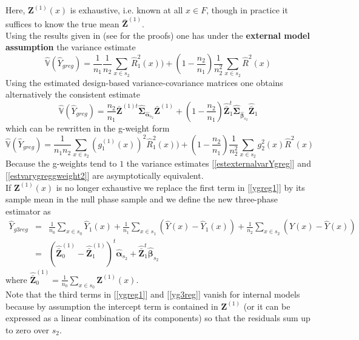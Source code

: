\documentclass[a4paper,12pt,leqno, titlepage]{article}
\newcommand{\VAR}{\mathbb{V}}
\begin{document}
Here, $\pmb{Z}^{(1)}(x)$ is exhaustive, i.e. known at all $x\in{F}$, though in practice it suffices to know the true mean $\bar{\pmb{Z}}^{(1)}$. \\
Using the results given in \cite{mandallaz4} (see \cite{mandallazreport3} for the proofs) one has under the \textbf{external model assumption} the variance estimate
\begin{equation}\label{estexternalvarYgreg}
\hat{\VAR}(\hat{Y}_{greg})=\frac{1}{n_1}\frac{1}{n_2}\sum_{x\in{s_2}}\hat{R}_{1}^2(x))
+ (1-\frac{n_2}{n_1})\frac{1}{n^2_2}\sum_{x\in{s_2}}\hat{R}^2(x)
\end{equation}
Using the estimated design-based variance-covariance matrices one obtains alternatively the consistent estimate
\begin{equation}\label{estvarygreggweight1}
\hat{\VAR}(\hat{Y}_{greg})=\frac{n_2}{n_1}\bar{\pmb{Z}}^{(1)t}\hat{\pmb{\Sigma}}_{\hat{\pmb{\alpha}}_{s_2}}
\bar{\pmb{Z}}^{(1)}+(1-\frac{n_2}{n_1})\hat{\bar{\pmb{Z}}}_1^t\hat{\pmb{\Sigma}}_{\hat{\pmb{\beta}}_{s_2}}
\hat{\bar{\pmb{Z}}}_1
\end{equation}
which can be rewritten in the g-weight form
\begin{equation}\label{estvarygreggweight2}
\hat{\VAR}(\hat{Y}_{greg})=\frac{1}{n_1n_2}\sum_{x\in{s_2}}(g_1^{(1)}(x))^2\hat{R}_{1}^2(x))
+ (1-\frac{n_2}{n_1})\frac{1}{n^2_2}\sum_{x\in{s_2}}g_2^2(x)\hat{R}^2(x)
\end{equation}
Because the g-weights tend to $1$ the variance estimates [\ref{estexternalvarYgreg}] and [\ref{estvarygreggweight2}] are asymptotically equivalent.\\
If $\pmb{Z}^{(1)}(x)$ is no longer exhaustive we replace the first term in [\ref{ygreg1}] by its sample mean in the null phase sample and we define the new three-phase estimator as
\begin{eqnarray}\label{yg3reg}
\hat{Y}_{g3reg} &=& \frac{1}{n_0} \sum_{x\in{s_0}} \hat{Y}_1(x)
+\frac{1}{n_1}\sum_{x\in{s}_1}(\hat{Y}(x)-\hat{Y}_1(x))
+ \frac{1}{n_2}\sum_{x\in{s}_2}(Y(x)-\hat{Y}(x)) \nonumber \\
&=& (\hat{\bar{\pmb{Z}}}^{(1)}_0-\hat{\bar{\pmb{Z}}}^{(1)}_1)^t\hat{\pmb{\alpha}}_{s_2} +
\hat{\bar{\pmb{Z}}}^t_1\hat{\pmb{\beta}}_{s_2}
\end{eqnarray}
where $\hat{\bar{\pmb{Z}}}^{(1)}_0=\frac{1}{n_0}\sum_{x\in{s_0}}\pmb{Z}^{(1)}(x)$.\\
Note that the third terms in [\ref{ygreg1}] and [\ref{yg3reg}] vanish for internal models because by assumption the intercept term is contained in $\pmb{Z}^{(1)}$ (or it can be expressed as a linear combination of its components) so that the residuals sum up to zero over $s_2$.\\
\end{document}
